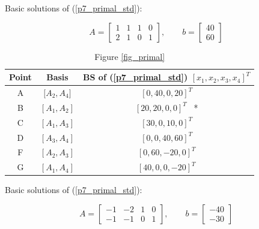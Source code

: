 \documentclass[12pt]{article}
\begin{document}
\FloatBarrier

Basic solutions of (\ref{p7_primal_std}):

$$
A = \begin{bmatrix}
1 & 1 & 1 & 0 \\
2 & 1 & 0 & 1
\end{bmatrix},  \qquad b = \begin{bmatrix}
40 \\ 60
\end{bmatrix}
$$

\FloatBarrier

\begin{table}[htbp]
\centering
\caption{Figure \ref{fig_primal}}
\label{BStable_primal}
\begin{tabular}{||c|c|c||}
\hline
 Point & Basis        & BS of (\ref{p7_primal_std}) $[x_1, x_2, x_3, x_4]^T$    \\
 \hline
A & ${[}A_2, A_4{]}$ & $[0, 40, 0, 20]^T$     \\
 \hline
B  &  $[A_1, A_2]$   & $ [20, 20, 0, 0]^T $  \ *  \\
 \hline
C  &  $[A_1, A_3]$   & $ [30, 0, 10, 0]^T $   \\
 \hline
D  &  $[A_3, A_4]$   & $ [0, 0, 40, 60]^T $    \\
\hline
F & $[A_2, A_3]$   & $ [0, 60, -20, 0]^T $    \\
\hline 
G & $[A_1, A_4]$   & $ [40, 0, 0, -20]^T $    \\
\hline 
\end{tabular}
\end{table}

\FloatBarrier

Basic solutions of (\ref{p7_primal_std}):

$$
A = \begin{bmatrix}
-1 & -2 & 1 & 0 \\
-1 & -1 & 0 & 1
\end{bmatrix},  \qquad b = \begin{bmatrix}
-40 \\ -30
\end{bmatrix}
$$

\FloatBarrier
\end{document}
